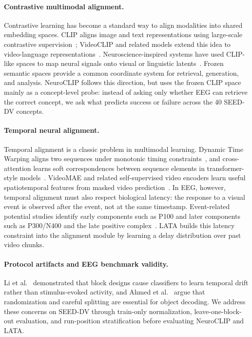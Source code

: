 \documentclass{article}
\begin{document}
\paragraph{Contrastive multimodal alignment.}
Contrastive learning has become a standard way to align modalities into shared
embedding spaces. CLIP aligns image and text representations using large-scale
contrastive supervision~\citep{radford2021clip}; VideoCLIP and related models
extend this idea to video-language representations~\citep{xu2021videoclip}.
Neuroscience-inspired systems have used CLIP-like spaces to map neural signals
onto visual or linguistic latents~\citep{scotti2024mindeye,fei2025perceptogram}.
Frozen semantic spaces provide a common coordinate system for retrieval,
generation, and analysis. NeuroCLIP follows this direction, but uses the frozen
CLIP space mainly as a concept-level probe: instead of asking
only whether EEG can retrieve the correct concept, we ask what predicts success
or failure across the 40 SEED-DV concepts.

\paragraph{Temporal neural alignment.}
Temporal alignment is a classic problem in multimodal learning. Dynamic Time
Warping aligns two sequences under monotonic timing constraints~\citep{sakoe1978dtw},
and cross-attention learns soft correspondences between sequence elements in
transformer-style models~\citep{vaswani2017attention}. VideoMAE and related
self-supervised video encoders learn useful spatiotemporal features from masked
video prediction~\citep{tong2022videomae}. In EEG, however, temporal alignment
must also respect biological latency: the response to a visual event is observed
after the event, not at the same timestamp. Event-related potential studies
identify early components such as P100 and later components such as P300/N400
and the late positive complex~\citep{luck2014erp,kutas2011thirty}. LATA builds
this latency constraint into the alignment module by learning a delay distribution
over past video chunks.

\paragraph{Protocol artifacts and EEG benchmark validity.}
Li et al.~\citep{li2021perils}  demonstrated that block designs cause classifiers to learn temporal drift rather than stimulus-evoked activity, and Ahmed et al.~\citep{ahmed2021object}
argue that randomization and careful splitting are essential for object decoding.
We address these concerns on SEED-DV through train-only normalization,
leave-one-block-out evaluation, and run-position stratification before
evaluating NeuroCLIP and LATA.
\end{document}
